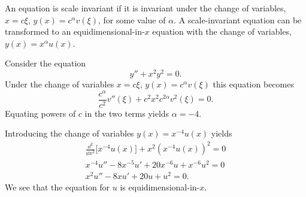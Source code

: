 \begin{Result}
  An equation is scale invariant if it is invariant under the change of 
  variables, $x = c\xi$, $y(x) = c^\alpha v(\xi)$, for some value of $\alpha$.
  A scale-invariant equation can be transformed to an equidimensional-in-$x$
  equation with the change of variables, $y(x) = x^\alpha u(x)$.
\end{Result}







\begin{Example}
  Consider the equation
  \[ y'' + x^2 y^2 = 0.\]
  Under the change of variables $x = c\xi$, $y(x) = c^\alpha v(\xi)$ this
  equation becomes
  \[ \frac{c^\alpha}{c^2}v''(\xi) + c^2 x^2 c^{2\alpha} v^2(\xi) = 0.\]
  Equating powers of $c$ in the two terms yields $\alpha = -4$.  

  Introducing the change of variables $y(x) = x^{-4}u(x)$ yields
  \begin{gather*}
    \frac{\dd^2}{\dd x^2} \big[ x^{-4}u(x) \big] + x^2 (x^{-4}u(x))^2 = 0 \\
    x^{-4}u'' - 8 x^{-5}u' + 20 x^{-6}u + x^{-6}u^2 = 0 \\
    \boxed{ x^2 u'' - 8 x u' + 20 u + u^2 = 0. }
  \end{gather*}
  We see that the equation for $u$ is equidimensional-in-$x$.
\end{Example}











